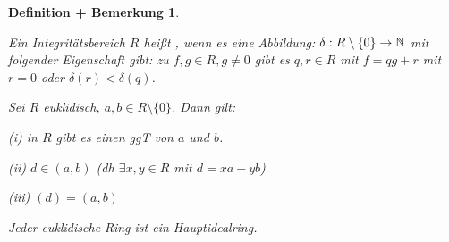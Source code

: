 \documentclass[a4paper,10pt,german]{scrbook}
\theoremstyle{saetze}
\theoremstyle{definitionen}
\newtheorem{DefBem}[Def]{Definition + Bemerkung}
\begin{document}
\begin{DefBem}
\begin{enum}
\item Ein Integritätsbereich $R$ heißt , wenn es
eine Abbildung: $\delta: R\setminus\{0\} \rightarrow \mathbb{N}$ mit
folgender Eigenschaft gibt: zu $f,g \in R, g\neq 0$ gibt es $q,r \in
R$ mit $f = qg + r$ mit $r=0$ oder $\delta(r) < \delta(q)$.

\item Sei $R$ euklidisch, $a,b \in R\setminus\{0\}$. Dann gilt:
    \begin{enum}
        \item[(i)] in $R$ gibt es einen ggT von $a$ und $b$.
        \item[(ii)] $d \in (a,b)$ (dh $\exists x,y \in R$ mit $d=xa
        +yb$)
        \item[(iii)] $(d) = (a,b)$
    \end{enum}
\item Jeder euklidische Ring ist ein Hauptidealring.
\end{enum}


\end{DefBem}
\end{document}
